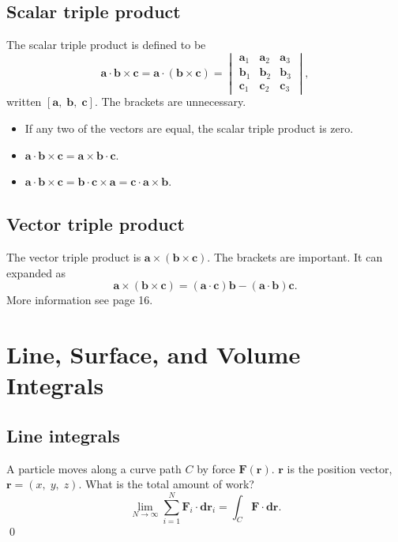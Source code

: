 \subsection{Scalar triple product}
The scalar triple product is defined to be 
\begin{equation}
    \bm{a} \cdot \bm{b} \times \bm{c}
    =
    \bm{a} \cdot (\bm{b} \times \bm{c})
    =
        \begin{vmatrix}
            \bm{a}_1 & \bm{a}_2 & \bm{a}_3 \\
            \bm{b}_1 & \bm{b}_2 & \bm{b}_3 \\
            \bm{c}_1 & \bm{c}_2 & \bm{c}_3 
        \end{vmatrix}
    ,
\end{equation}
written $[\bm{a},\;\bm{b},\;\bm{c}]$. The brackets are unnecessary.

\begin{itemize}
    \item If any two of the vectors are equal, the scalar triple product is zero.
    \item $ \bm{a} \cdot \bm{b} \times \bm{c}
            = \bm{a} \times \bm{b} \cdot \bm{c} $.
    \item $ \bm{a} \cdot \bm{b} \times \bm{c}
            = \bm{b} \cdot \bm{c} \times \bm{a} 
            = \bm{c} \cdot \bm{a} \times \bm{b} $.
\end{itemize}

\subsection{Vector triple product}
The vector triple product is 
$\bm{a} \times (\bm{b}\times \bm{c})$. 
The brackets are important. 
It can expanded as
\begin{equation}
    \bm{a} \times (\bm{b}\times \bm{c})
    = (\bm{a} \cdot \bm{c}) \bm{b}
    - (\bm{a} \cdot \bm{b}) \bm{c}.
\end{equation}
More information see page 16.

\section{Line, Surface, and Volume Integrals}
\subsection{Line integrals}
\begin{example}
    A particle moves along a curve path $C$ by force $\bm{F}(\bm{r})$. 
    $\bm{r}$ is the position vector, $\bm{r} = (x,\;y,\;z)$. 
    What is the total amount of work?
    \begin{equation}
        \lim_{N\to \infty} \sum_{i=1}^N \bm{F}_i \cdot \bm{dr}_i
        = \int_C \bm{F} \cdot \bm{dr}.
    \end{equation}
    \qed
\end{example}
